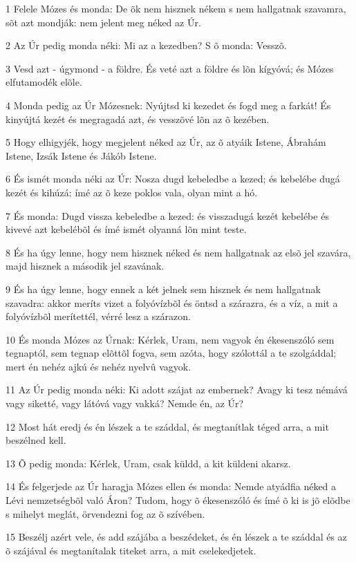 \par 1 Felele Mózes és monda: De õk nem hisznek nékem s nem hallgatnak szavamra, sõt azt mondják: nem jelent meg néked az Úr.
\par 2 Az Úr pedig monda néki: Mi az a kezedben? S õ monda: Vesszõ.
\par 3 Vesd azt - úgymond - a földre. És veté azt a földre és lõn kígyóvá; és Mózes elfutamodék elõle.
\par 4 Monda pedig az Úr Mózesnek: Nyújtsd ki kezedet és fogd meg a farkát! És kinyújtá kezét és megragadá azt, és vesszõvé lõn az õ kezében.
\par 5 Hogy elhigyjék, hogy megjelent néked az Úr, az õ atyáik Istene, Ábrahám Istene, Izsák Istene és Jákób Istene.
\par 6 És ismét monda néki az Úr: Nosza dugd kebeledbe a kezed; és kebelébe dugá kezét és kihúzá: ímé az õ keze poklos vala, olyan mint a hó.
\par 7 És monda: Dugd vissza kebeledbe a kezed: és visszadugá kezét kebelébe és kivevé azt kebelébõl és ímé ismét olyanná lõn mint teste.
\par 8 És ha úgy lenne, hogy nem hisznek néked és nem hallgatnak az elsõ jel szavára, majd hisznek a második jel szavának.
\par 9 És ha úgy lenne, hogy ennek a két jelnek sem hisznek és nem hallgatnak szavadra: akkor meríts vizet a folyóvízbõl és öntsd a szárazra, és a víz, a mit a folyóvízbõl merítettél, vérré lesz a szárazon.
\par 10 És monda Mózes az Úrnak: Kérlek, Uram, nem vagyok én ékesenszóló sem tegnaptól, sem tegnap elõttõl fogva, sem azóta, hogy szólottál a te szolgáddal; mert én nehéz ajkú és nehéz nyelvû vagyok.
\par 11 Az Úr pedig monda néki: Ki adott szájat az embernek? Avagy ki tesz némává vagy siketté, vagy látóvá vagy vakká? Nemde én, az Úr?
\par 12 Most hát eredj és én lészek a te száddal, és megtanítlak téged arra, a mit beszélned kell.
\par 13 Õ pedig monda: Kérlek, Uram, csak küldd, a kit küldeni akarsz.
\par 14 És felgerjede az Úr haragja Mózes ellen és monda: Nemde atyádfia néked a Lévi nemzetségbõl való Áron? Tudom, hogy õ ékesenszóló és ímé õ ki is jõ elõdbe  s mihelyt meglát, örvendezni fog az õ szívében.
\par 15 Beszélj azért vele, és add szájába a beszédeket, és én lészek a te száddal és az õ szájával és megtanítalak titeket arra, a mit cselekedjetek.
